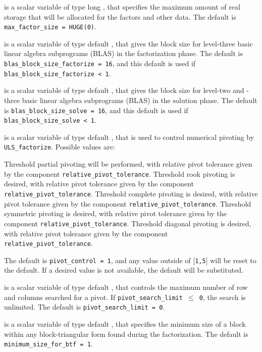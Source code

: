 \documentclass{galahad}
\newcommand{\packagename}{ULS}
\begin{document}
\begin{description}
 is a scalar variable of type long \integer,
that specifies the maximum amount of real storage that will be
allocated for the factors and other data.
The default is {\tt max\_factor\_size = HUGE(0)}.

 is a scalar variable of type default \integer,
that gives the block size for level-three basic linear algebra subprograms
(BLAS) in the factorization phase.
The default is {\tt blas\_block\_size\_factorize = 16},
and this default is used if {\tt blas\_block\_size\_factorize < 1}.

 is a scalar variable of type default \integer,
that gives the block size for level-two and -three basic linear algebra
subprograms (BLAS) in the solution phase.
The default is {\tt blas\_block\_size\_solve = 16},
and this default is used if {\tt blas\_block\_size\_solve < 1}.

 is a scalar variable of type default \integer,
that is used to control numerical pivoting by {\tt \packagename\_\-factorize}.
Possible values are:
\begin{description}
   Threshold partial pivoting will be performed, with relative pivot
     tolerance given by the component {\tt relative\_\-pivot\_tolerance}.
   Threshold rook pivoting is desired, with relative pivot
     tolerance given by the component {\tt relative\_\-pivot\_\-tolerance}.
   Threshold complete pivoting is desired, with relative pivot
     tolerance given by the component {\tt relative\_\-pivot\_tolerance}.
   Threshold symmetric pivoting is desired, with relative pivot
     tolerance given by the component {\tt relative\_\-pivot\_tolerance}.
   Threshold diagonal pivoting is desired, with relative pivot
     tolerance given by the component {\tt relative\_\-pivot\_tolerance}.
\end{description}
The default is {\tt pivot\_control = 1}, and any value outside of
$[${\tt1,5}$]$ will be reset to the default. If a desired value
is not available, the default will be substituted.

 is a scalar variable of type default \integer,
that controls the maximum number of row and columns searched for a pivot.
If {\tt pivot\_search\_\-limit $\leq$ 0}, the search is unlimited.
The default is {\tt pivot\_search\_\-limit = 0}.

 is a scalar variable of type default \integer,
that specifies the minimum size of a block within any block-triangular
form found during the factorization.
The default is {\tt minimum\_size\_for\_btf = 1}.


\end{description}
\end{document}

